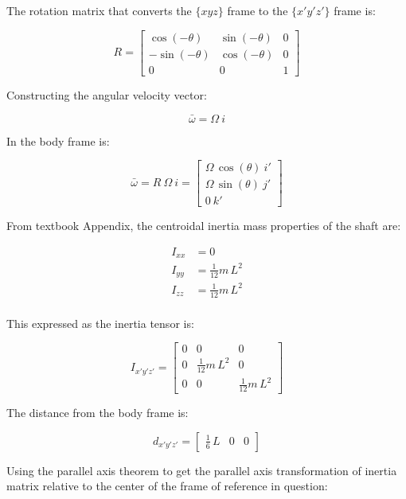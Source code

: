 \documentclass[12pt, letterpaper]{../assignment}
\begin{document}
The rotation matrix that converts the $\{xyz\}$ frame to the $\{x'y'z'\}$ frame is:

$$ R = \left[\begin{array}{ccc} \cos\left(-\theta \right) & \sin\left(-\theta \right) & 0\\ -\sin\left(-\theta \right) & \cos\left(-\theta \right) & 0\\ 0 & 0 & 1 \end{array}\right]$$

Constructing the angular velocity vector:

$$ \bar{\omega} = \Omega\ i $$

In the body frame is:

$$ \bar{\omega} = R\ \Omega\ i =
\left[\begin{array}{r} \Omega \,\cos\left(\theta \right)\ i'\\
    \Omega \,\sin\left(\theta \right)\ j'\\
    0\ k' \end{array}\right]$$

From textbook Appendix,
the centroidal inertia mass properties of the shaft are:

\begin{equation*}
    \begin{aligned}
        I_{xx} &= 0 \\
        I_{yy} &= \frac{1}{12}m\,L^2\\
        I_{zz} &= \frac{1}{12}m\,L^2\\
    \end{aligned}
\end{equation*}

This expressed as the inertia tensor is:

$$ I_{x'y'z'} = \left[\begin{array}{ccc}
    0 & 0 & 0\\
    0 & \frac{1}{12}m\,L^2 & 0\\
    0 & 0 & \frac{1}{12}m\,L^2
\end{array}\right] $$

The distance from the body frame is:

$$ d_{x'y'z'} = \left[\begin{array}{ccc} \frac{1}{6}\,L & 0 & 0 \end{array}\right] $$

Using the parallel axis theorem to get the parallel axis transformation of inertia matrix
relative to the center of the frame of reference in question:
\end{document}
